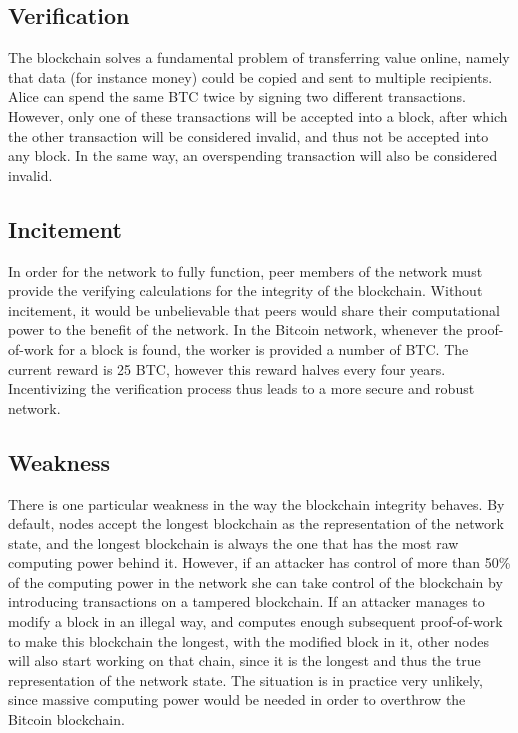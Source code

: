 \subsection{Verification}
The blockchain solves a fundamental problem of transferring value online, namely that data (for instance money) could be copied and sent to multiple recipients. Alice can spend the same BTC twice by signing two different transactions. However, only one of these transactions will be accepted into a block, after which the other transaction will be considered invalid, and thus not be accepted into any block. In the same way, an overspending transaction will also be considered invalid.

\subsection{Incitement}
In order for the network to fully function, peer members of the network must provide the verifying calculations for the integrity of the blockchain. Without incitement, it would be unbelievable that peers would share their computational power to the benefit of the network. In the Bitcoin network, whenever the proof-of-work for a block is found, the worker is provided a number of BTC. The current reward is 25 BTC, however this reward halves every four years. Incentivizing the verification process thus leads to a more secure and robust network.

\subsection{Weakness}
There is one particular weakness in the way the blockchain integrity behaves. By default, nodes accept the longest blockchain as the representation of the network state, and the longest blockchain is always the one that has the most raw computing power behind it. However, if an attacker has control of more than 50\% of the computing power in the network she can take control of the blockchain by introducing transactions on a tampered blockchain. If an attacker manages to modify a block in an illegal way, and computes enough subsequent proof-of-work to make this blockchain the longest, with the modified block in it, other nodes will also start working on that chain, since it is the longest and thus the true representation of the network state. The situation is in practice very unlikely, since massive computing power would be needed in order to overthrow the Bitcoin blockchain.

